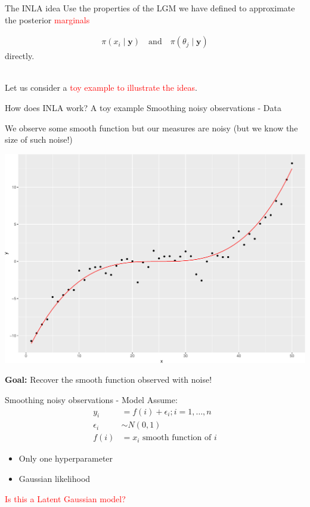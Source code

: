 \documentclass[
  ignorenonframetext,
]{beamer}
\begin{document}
\begin{frame}{The INLA idea}
\protect\hypertarget{the-inla-idea}{}
Use the properties of the LGM we have defined to approximate the
posterior \textcolor{red}{marginals}

\[
\begin{aligned}
        \pi(x_i \mid \boldsymbol{y})\quad \text{and} \quad \pi(\theta_j \mid \boldsymbol{y})
    \end{aligned}
\] directly.\\
\strut \\
Let us consider a \textcolor{red}{toy example to illustrate the ideas}.
\end{frame}

\begin{frame}{How does INLA work? A toy example}
\protect\hypertarget{how-does-inla-work-a-toy-example}{}
Smoothing noisy observations - Data

We observe some smooth function but our measures are noisy (but we know
the size of such noise!)

\begin{center}\includegraphics[width=0.6\linewidth]{Part2_deterministic_files/figure-beamer/unnamed-chunk-1-1} \end{center}

\textbf{Goal:} Recover the smooth function observed with noise!
\end{frame}

\begin{frame}{Smoothing noisy observations - Model}
\protect\hypertarget{smoothing-noisy-observations---model}{}
Assume: \begin{align*}
y_i &= f(i) + \epsilon_i; i = 1,\dots,n \\\nonumber
\epsilon_i&\sim N(0,1) \\\nonumber
f(i) &= x_i\text{ smooth function of } i\nonumber
\end{align*}

\begin{itemize}
\item
  Only one hyperparameter
\item
  Gaussian likelihood
\end{itemize}

\textcolor{red}{Is this a Latent Gaussian model?}
\end{frame}
\end{document}
